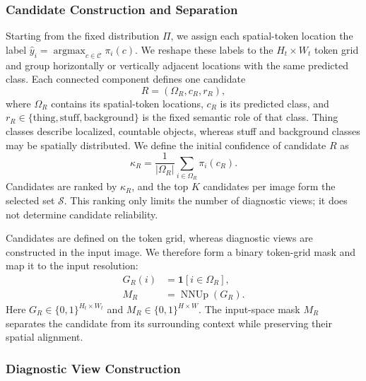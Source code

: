 \documentclass[letterpaper]{article}
\begin{document}
	\subsubsection{Candidate Construction and Separation}
	
	Starting from the fixed distribution $\Pi$, we assign each spatial-token location the label $\widehat y_i=\operatorname*{argmax}_{c\in\mathcal C}\pi_i(c)$. We reshape these labels to the $H_t\times W_t$ token grid and group horizontally or vertically adjacent locations with the same predicted class. Each connected component defines one candidate
	\begin{equation}
		R=(\Omega_R,c_R,r_R),
	\end{equation}
	where $\Omega_R$ contains its spatial-token locations, $c_R$ is its predicted class, and $r_R\in\{\mathrm{thing},\mathrm{stuff},\mathrm{background}\}$ is the fixed semantic role of that class. Thing classes describe localized, countable objects, whereas stuff and background classes may be spatially distributed.
	We define the initial confidence of candidate $R$ as
	\begin{equation}
		\kappa_R
		=
		\frac{1}{|\Omega_R|}
		\sum_{i\in\Omega_R}
		\pi_i(c_R).
	\end{equation}
	Candidates are ranked by $\kappa_R$, and the top $K$ candidates per image form the selected set $\mathcal S$. This ranking only limits the number of diagnostic views; it does not determine candidate reliability.
	
	Candidates are defined on the token grid, whereas diagnostic views are constructed in the input image. We therefore form a binary token-grid mask and map it to the input resolution:
	\begin{align}
		G_R(i)
		&=
		\mathbf{1}[i\in\Omega_R],
		\\
		M_R
		&=
		\operatorname{NNUp}(G_R).
	\end{align}
	Here $G_R\in\{0,1\}^{H_t\times W_t}$ and $M_R\in\{0,1\}^{H\times W}$. The input-space mask $M_R$ separates the candidate from its surrounding context while preserving their spatial alignment.
	
	\subsubsection{Diagnostic View Construction}
	
\end{document}
